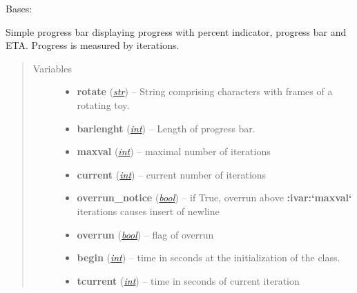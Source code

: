 \documentclass[a4paper,10pt,english]{sphinxmanual}
\begin{document}

\begin{fulllineitems}
\label{aqueduct.utils.log:aqueduct.utils.log.SimpleProgressBar}
Bases: \href{http://docs.python.org/2/library/functions.html\#object}{}

Simple progress bar displaying progress with percent indicator, progress bar and ETA.
Progress is measured by iterations.
\begin{quote}\begin{description}
\item[{Variables}] \leavevmode\begin{itemize}
\item {} 
\textbf{rotate} (\href{http://docs.python.org/2/library/functions.html\#str}{\emph{str}}) -- String comprising characters with frames of a rotating toy.

\item {} 
\textbf{barlenght} (\href{http://docs.python.org/2/library/functions.html\#int}{\emph{int}}) -- Length of progress bar.

\item {} 
\textbf{maxval} (\href{http://docs.python.org/2/library/functions.html\#int}{\emph{int}}) -- maximal number of iterations

\item {} 
\textbf{current} (\href{http://docs.python.org/2/library/functions.html\#int}{\emph{int}}) -- current number of iterations

\item {} 
\textbf{overrun\_notice} (\href{http://docs.python.org/2/library/functions.html\#bool}{\emph{bool}}) -- if True, overrun above {\color{red}\bfseries{}:ivar:{}`maxval{}`} iterations causes insert of newline

\item {} 
\textbf{overrun} (\href{http://docs.python.org/2/library/functions.html\#bool}{\emph{bool}}) -- flag of overrun

\item {} 
\textbf{begin} (\href{http://docs.python.org/2/library/functions.html\#int}{\emph{int}}) -- time in seconds at the initialization of the {\hyperref[aqueduct.utils.log:aqueduct.utils.log.SimpleProgressBar]{}} class.

\item {} 
\textbf{tcurrent} (\href{http://docs.python.org/2/library/functions.html\#int}{\emph{int}}) -- time in seconds of current iteration


\end{itemize}
\end{description}
\end{quote}
\end{fulllineitems}
\end{document}
